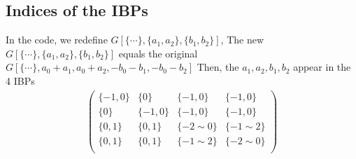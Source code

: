 \documentclass[a4paper,12pt]{article}
\begin{document}
\subsection{Indices of the IBPs}
In the code, we redefine $G[\{\cdots\},\{a_1,a_2\},\{b_1,b_2\}]$, The new $G[\{\cdots\},\{a_1,a_2\},\{b_1,b_2\}]$ equals the original $G[\{\cdots\},{a_0+a_1,a_0+a_2},{-b_0-b_1,-b_0-b_2}]$
Then, the $a_1,a_2,b_1,b_2$ appear in the 4 IBPs
\begin{align}
\left(
\begin{array}{cccc}
 \{-1,0\} & \{0\} & \{-1,0\} & \{-1,0\} \\
 \{0\} & \{-1,0\} & \{-1,0\} & \{-1,0\} \\
 \{0,1\} & \{0,1\} & \{-2\sim0\} & \{-1\sim2\} \\
 \{0,1\} & \{0,1\} & \{-1\sim2\} & \{-2\sim0\} \\
\end{array}
\right)
\end{align}
\end{document}
